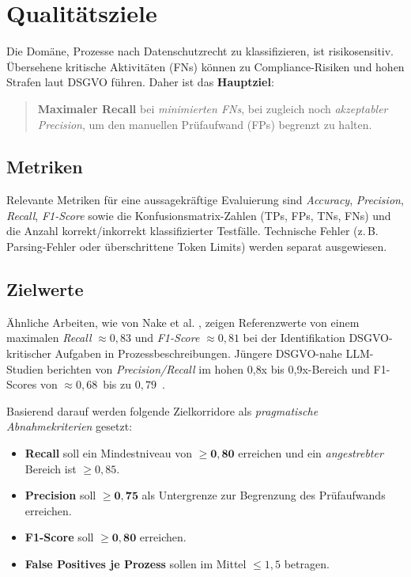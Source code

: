 \section{Qualitätsziele}\label{sec:qualitatsziele}

Die Domäne, Prozesse nach Datenschutzrecht zu klassifizieren, ist risikosensitiv. Übersehene kritische Aktivitäten (\acp{FN}) können zu Compliance-Risiken und hohen Strafen laut \ac{DSGVO} führen. Daher ist das \textbf{Hauptziel}:

\begin{quote}
    \textbf{Maximaler Recall} bei \emph{minimierten \acp{FN}}, bei zugleich noch \emph{akzeptabler Precision}, um den manuellen Prüfaufwand (\acp{FP}) begrenzt zu halten.
\end{quote}

\subsection*{Metriken}

Relevante Metriken für eine aussagekräftige Evaluierung sind \emph{Accuracy}, \emph{Precision}, \emph{Recall}, \emph{F1-Score} sowie die Konfusionsmatrix-Zahlen (\acp{TP}, \acp{FP}, \acp{TN}, \acp{FN}) und die Anzahl korrekt/inkorrekt klassifizierter Testfälle. Technische Fehler (z.\,B. Parsing-Fehler oder überschrittene Token Limits) werden separat ausgewiesen.

\subsection*{Zielwerte}

Ähnliche Arbeiten, wie von Nake et al. \cite{nake2023towards}, zeigen Referenzwerte von einem maximalen \emph{Recall} $\approx 0{,}83$ und \emph{F1-Score} $\approx 0{,}81$ bei der Identifikation \ac{DSGVO}-kritischer Aufgaben in Prozessbeschreibungen. Jüngere \ac{DSGVO}-nahe \ac{LLM}-Studien berichten von \emph{Precision/Recall} im hohen 0{,}8x bis 0{,}9x-Bereich \cite{hooda2024policylr} und F1-Scores von $\approx 0{,}68$~bis zu \approx $0{,}79$~\cite{schwerin2024systematic}.

Basierend darauf werden folgende Zielkorridore als \emph{pragmatische Abnahmekriterien} gesetzt:

\begin{itemize}
    \item \textbf{Recall} soll ein Mindestniveau von $\mathbf{\geq 0{,}80}$ erreichen und ein \emph{angestrebter} Bereich ist $\geq 0{,}85$.
    \item \textbf{Precision} soll $\mathbf{\geq 0{,}75}$ als Untergrenze zur Begrenzung des Prüfaufwands erreichen.
    \item \textbf{F1-Score} soll $\mathbf{\geq 0{,}80}$  erreichen.
    \item \textbf{False Positives je Prozess} sollen im Mittel \textbf{$\leq 1{,}5$} betragen.
\end{itemize}

